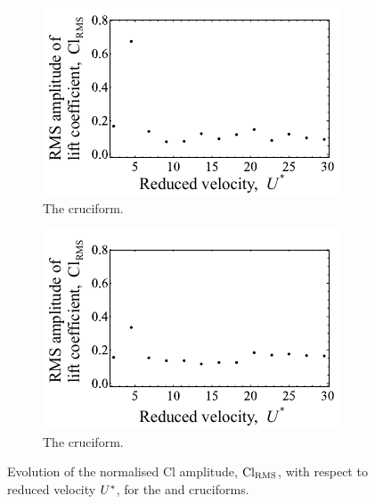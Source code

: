 \documentclass[oneside]{utmthesis}
\begin{document}
\begin{figure}
  \centering
  \begin{subfigure}[h]{0.4\textwidth}
    \includegraphics[width=\textwidth]{figs/clRMS4}
    \caption{The \angfo{} cruciform.}
    \label{fig:clRMS4}
  \end{subfigure}
  \hspace{6mm}
  \begin{subfigure}[h]{0.4\textwidth}
    \includegraphics[width=\textwidth]{figs/clRMS3}
    \caption{The \angth{} cruciform.}
    \label{fig:clRMS3}
  \end{subfigure}

  \label{fig:clRMS43}
  \caption{Evolution of the normalised Cl \rms{} amplitude, $\text{Cl}_{\text{RMS}}$, with respect to reduced velocity $U^{*}$, for the \angfo{} and \angth{} cruciforms.}
\end{figure}
\end{document}
